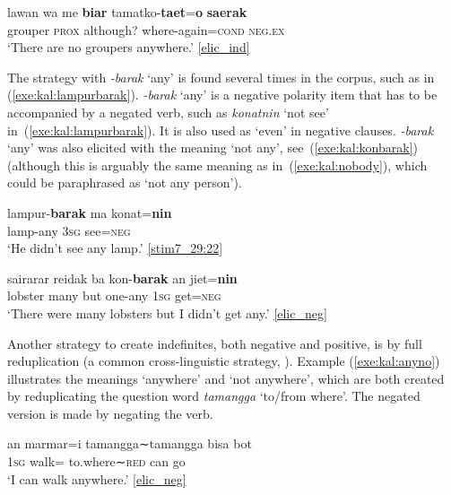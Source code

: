 \documentclass[output=paper,colorlinks,citecolor=brown,draft]{langscibook}
\begin{document}
\ex \label{exe:kal:nowhere1}{
	\gll lawan wa me \textbf{biar} tamatko-\textbf{taet}=\textbf{o} \textbf{saerak}\\
	grouper \textsc{prox} {\glme} although? where-again=\textsc{cond} \textsc{neg.ex}\\
	\glt `There are no groupers anywhere.' {\href{http://hdl.handle.net/10050/00-0000-0000-0004-1C60-A}{[elic\_ind]}}}
\z \z 

The strategy with \textit{-barak} `any' is found several times in the corpus, such as in (\ref{exe:kal:lampurbarak}). \textit{-barak} `any' is a negative polarity item that has to be accompanied by a negated verb, such as \textit{konatnin} `not see' in~(\ref{exe:kal:lampurbarak}). It is also used as `even' in negative clauses. \textit{-barak} `any' was also elicited with the meaning `not any', see~(\ref{exe:kal:konbarak}) (although this is arguably the same meaning as in~(\ref{exe:kal:nobody}), which could be paraphrased as `not any person').

\ea \label{exe:kal:lampurbarak}
\gll lampur-\textbf{barak} ma konat=\textbf{nin}\\
lamp-any \textsc{3sg} see=\textsc{neg}\\
\glt `He didn't see any lamp.' {\href{http://hdl.handle.net/10050/00-0000-0000-0004-1BAA-C}{[stim7\_29:22]}}
\z 

\ea \label{exe:kal:konbarak}
\gll sairarar reidak ba kon-\textbf{barak} an jiet=\textbf{nin}\\
lobster many but one-any \textsc{1sg} get=\textsc{neg}\\
\glt `There were many lobsters but I didn't get any.' {\href{http://hdl.handle.net/10050/00-0000-0000-0004-1C60-A}{[elic\_neg]}}
\z 


Another strategy to create indefinites, both negative and positive, is by full reduplication (a common cross-linguistic strategy, \citealt[][179]{Haspelmath1997}). Example (\ref{exe:kal:anyno}) illustrates the meanings `anywhere' and `not anywhere', which are both created by reduplicating the question word \textit{tamangga} `to/from where'. The negated version is made by negating the verb.

\ea \label{exe:kal:anyno}
\ea \label{exe:kal:anywhere}
{\gll an marmar=i tamangga∼tamangga bisa bot\\
	\textsc{1sg} walk={\gli} to.where∼\textsc{red} can go\\
	\glt `I can walk anywhere.' {\href{http://hdl.handle.net/10050/00-0000-0000-0004-1C60-A}{[elic\_neg]}}
}
\end{document}
